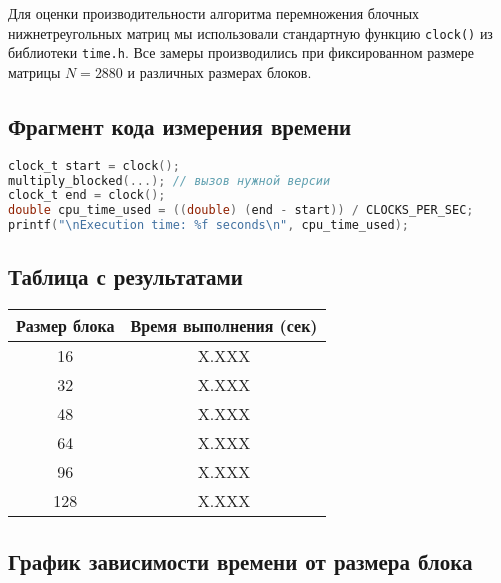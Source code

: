 \documentclass[14pt, russian]{matmex-diploma-custom}
\begin{document}
Для оценки производительности алгоритма перемножения блочных нижнетреугольных матриц мы использовали стандартную функцию \texttt{clock()} из библиотеки \texttt{time.h}. Все замеры производились при фиксированном размере матрицы $N = 2880$ и различных размерах блоков.

\subsection*{Фрагмент кода измерения времени}

{\footnotesize
\begin{lstlisting}[language=C, basicstyle=\ttfamily\footnotesize]
clock_t start = clock();
multiply_blocked(...); // вызов нужной версии
clock_t end = clock();
double cpu_time_used = ((double) (end - start)) / CLOCKS_PER_SEC;
printf("\nExecution time: %f seconds\n", cpu_time_used);
\end{lstlisting}
}

\subsection*{Таблица с результатами}

\begin{center}
\begin{tabular}{|c|c|}
\hline
\textbf{Размер блока} & \textbf{Время выполнения (сек)} \\
\hline
16 & X.XXX \\
32 & X.XXX \\
48 & X.XXX \\
64 & X.XXX \\
96 & X.XXX \\
128 & X.XXX \\
\hline
\end{tabular}
\end{center}

\subsection*{График зависимости времени от размера блока}

\begin{center}
\end{center}
\end{document}
